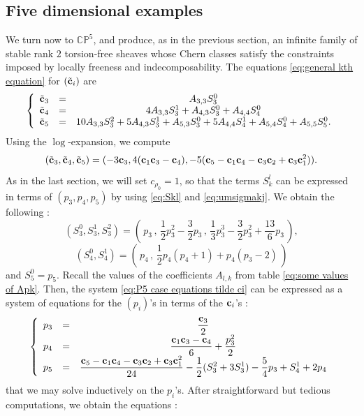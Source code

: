 \documentclass[a4paper,10pt]{amsart}
\theoremstyle{plain}{
    \newtheorem{theorem}{Theorem}[section]
    \newtheorem{lemma}[theorem]{Lemma}
    \newtheorem{corollary}[theorem]{Corollary}
    \newtheorem{proposition}[theorem]{Proposition}
    \newtheorem{conjecture}[theorem]{Conjecture}
}
\theoremstyle{definition}{
    \newtheorem{definition}[theorem]{Definition}
    \newtheorem{defn-thm}[theorem]{Definition-Theorem}
    \newtheorem{example}[theorem]{Example}
    \newtheorem{notation}[theorem]{Notation}
}
\theoremstyle{remark}{
    \newtheorem{remark}[theorem]{Remark}
    \newtheorem{problem}[theorem]{Problem}
    \newtheorem{question}[theorem]{Question}
}
\def\uc{{\bf c}}
\def\P{\mathbb{P}}
\def\C{\mathbb{C}}
\begin{document}
\subsection{Five dimensional examples}
\label{sec:P5}
We turn now to $\C\P^5$, and produce, as in the previous section, an infinite family of stable rank $2$ torsion-free sheaves whose Chern classes satisfy the constraints imposed by locally freeness and indecomposability. The equations \eqref{eq:general kth equation} for $(\tilde \uc_i)$ are
\begin{equation}
 \label{eq:P5 case equations tilde ci}
\left\{
\begin{array}{ccc}
\tilde \uc_3 & = & A_{3,3}S_3^0 \\
\tilde \uc_4 & = & 4A_{3,3} S_3^1+A_{4,3}S_3^0+A_{4,4}S_4^0\\
\tilde \uc_5 & = & 10 A_{3,3}S_3^2+5 A_{4,3}S_3^1+A_{5,3}S_3^0+5A_{4,4}S_4^1+A_{5,4}S_4^0+A_{5,5}S_5^0.
\end{array}
\right.
\end{equation}
Using the $\log$-expansion, we compute 
$$
(\tilde \uc_3,\tilde\uc_4,\tilde\uc_5)=(-3\uc_3,4(\uc_1\uc_3-\uc_4),-5(\uc_5-\uc_1\uc_4-\uc_3\uc_2+\uc_3\uc_1^2)).
$$
As in the last section, we will set $c_{\rho_0}=1$, so that the terms $S_k^l$ can be expressed in terms of $(p_3,p_4,p_5)$ by using \eqref{eq:Skl} and \eqref{eq:umsigmakj}. We obtain the following :
$$
(S_3^0,S_3^1,S_3^2)=(\,p_3\,,\,\frac{1}{2}p_3^2-\frac{3}{2}p_3\, ,\, \frac{1}{3}p_3^3-\frac{3}{2}p_3^2 +\frac{13}{6}p_3\, ),
$$
$$
(S_4^0,S_4^1)=(\,p_4 \,,\, \frac{1}{2}p_4(p_4+1)+p_4(p_3-2)\,)
$$
and $S_5^0=p_5$. Recall the values of the coefficients $A_{l,k}$ from table \eqref{eq:some values of Apk}. Then, the system \eqref{eq:P5 case equations tilde ci}  can be expressed as a system of equations for the $(p_i)$'s in terms of the $\uc_i$'s :
\begin{equation}
 \label{eq:P5 case equations pi before solving}
\left\{
\begin{array}{ccc}
p_3 & = & \displaystyle\frac{\uc_3}{2} \\
p_4 & = & \displaystyle\frac{\uc_1\uc_3-\uc_4}{6}+\frac{p_3^2}{2}\\
p_5 & = & \displaystyle\frac{\uc_5-\uc_1\uc_4-\uc_3\uc_2+\uc_3\uc_1^2}{24}-\frac{1}{2}(S_3^2+3S_3^1)-\frac{5}{4}p_3+S_4^1+2p_4
\end{array}
\right.
\end{equation}
that we may solve inductively on the $p_i$'s. After  straightforward but tedious computations, we obtain the equations :
\end{document}
